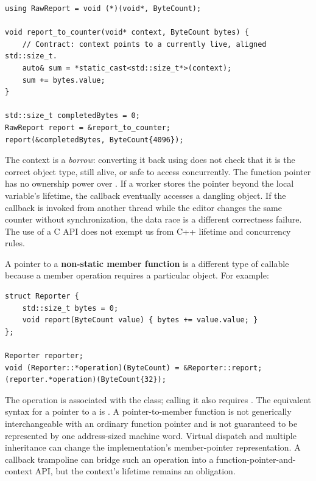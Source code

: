 \begin{verbatim}
using RawReport = void (*)(void*, ByteCount);

void report_to_counter(void* context, ByteCount bytes) {
    // Contract: context points to a currently live, aligned std::size_t.
    auto& sum = *static_cast<std::size_t*>(context);
    sum += bytes.value;
}

std::size_t completedBytes = 0;
RawReport report = &report_to_counter;
report(&completedBytes, ByteCount{4096});
\end{verbatim}

The  context is a \emph{borrow}: converting it back using  does not check that it is the correct object type, still alive, or safe to access concurrently. The function pointer has no ownership power over . If a worker stores the pointer beyond the local variable's lifetime, the callback eventually accesses a dangling object. If the callback is invoked from another thread while the editor changes the same counter without synchronization, the data race is a different correctness failure. The use of a C API does not exempt us from C++ lifetime and concurrency rules.

A pointer to a \textbf{non-static member function} is a different type of callable because a member operation requires a particular object. For example:

\begin{verbatim}
struct Reporter {
    std::size_t bytes = 0;
    void report(ByteCount value) { bytes += value.value; }
};

Reporter reporter;
void (Reporter::*operation)(ByteCount) = &Reporter::report;
(reporter.*operation)(ByteCount{32});
\end{verbatim}

The operation is associated with the  class; calling it also requires . The equivalent syntax for a pointer to a  is . A pointer-to-member function is not generically interchangeable with an ordinary function pointer and is not guaranteed to be represented by one address-sized machine word. Virtual dispatch and multiple inheritance can change the implementation's member-pointer representation. A callback trampoline can bridge such an operation into a function-pointer-and-context API, but the context's lifetime remains an obligation.

